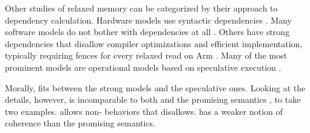 Other studies of relaxed memory can be categorized by their approach to
dependency calculation.  Hardware models use syntactic dependencies
\cite{alglave}.  Many software models do not bother with dependencies at all
\cite{Batty:2011:MCC:1926385.1926394, DBLP:journals/pacmpl/WattRP19,
  DBLP:conf/pldi/WattPPBDFPG20, goMM}.  Others have strong dependencies that
disallow compiler optimizations and efficient implementation, typically
requiring fences for every relaxed read on Arm
\cite{Lamport:1979:MMC:1311099.1311750, DBLP:conf/pldi/LahavVKHD17,
  Dolan:2018:BDR:3192366.3192421, DBLP:conf/lics/JeffreyR16,
  Boehm:2014:OGA:2618128.2618134}. %
%
Many of the most prominent models are operational models based on speculative
execution \cite{Manson:2005:JMM:1047659.1040336,
  DBLP:conf/esop/JagadeesanPR10,
  DBLP:conf/popl/KangHLVD17,DBLP:journals/pacmpl/ChakrabortyV19,DBLP:conf/pldi/LeeCPCHLV20,promising-ldrf}.

Morally, \PwT{} fits between the strong models and the speculative ones.
Looking at the details, however, \PwTmca{} is incomparable to both \rcXI{}
\cite{DBLP:conf/pldi/LahavVKHD17} and the promising semantics
\cite{DBLP:conf/popl/KangHLVD17}, to take two examples.  \rcXI{} allows
non-\mca{} behaviors that \PwTmca{} disallows.  \PwTmca{} has a weaker notion
of coherence than the promising semantics.



